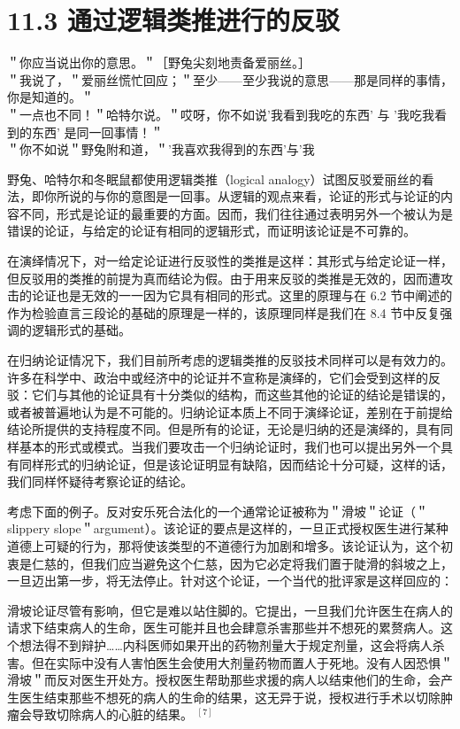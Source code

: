 \section*{11.3 通过逻辑类推进行的反驳}
＂你应当说出你的意思。＂［野兔尖刻地责备爱丽丝。］\\
＂我说了，＂爱丽丝慌忙回应；＂至少——至少我说的意思——那是同样的事情，你是知道的。＂\\
＂一点也不同！＂哈特尔说。＂哎呀，你不如说'我看到我吃的东西' 与 '我吃我看到的东西' 是同一回事情！＂\\
＂你不如说＂野兔附和道，＂'我喜欢我得到的东西'与'我

野兔、哈特尔和冬眠鼠都使用逻辑类推（logical analogy）试图反驳爱丽丝的看法，即你所说的与你的意图是一回事。从逻辑的观点来看，论证的形式与论证的内容不同，形式是论证的最重要的方面。因而，我们往往通过表明另外一个被认为是错误的论证，与给定的论证有相同的逻辑形式，而证明该论证是不可靠的。

在演绎情况下，对一给定论证进行反驳性的类推是这样：其形式与给定论证一样，但反驳用的类推的前提为真而结论为假。由于用来反驳的类推是无效的，因而遭攻击的论证也是无效的一一因为它具有相同的形式。这里的原理与在 6.2 节中阐述的作为检验直言三段论的基础的原理是一样的，该原理同样是我们在 8.4 节中反复强调的逻辑形式的基础。

在归纳论证情况下，我们目前所考虑的逻辑类推的反驳技术同样可以是有效力的。许多在科学中、政治中或经济中的论证并不宣称是演绎的，它们会受到这样的反驳：它们与其他的论证具有十分类似的结构，而这些其他的论证的结论是错误的，或者被普遍地认为是不可能的。归纳论证本质上不同于演绎论证，差别在于前提给结论所提供的支持程度不同。但是所有的论证，无论是归纳的还是演绎的，具有同样基本的形式或模式。当我们要攻击一个归纳论证时，我们也可以提出另外一个具有同样形式的归纳论证，但是该论证明显有缺陷，因而结论十分可疑，这样的话，我们同样怀疑待考察论证的结论。

考虑下面的例子。反对安乐死合法化的一个通常论证被称为＂滑坡＂论证（＂slippery slope＂argument）。该论证的要点是这样的，一旦正式授权医生进行某种道德上可疑的行为，那将使该类型的不道德行为加剧和增多。该论证认为，这个初衷是仁慈的，但我们应当避免这个仁慈，因为它必定将我们置于陡滑的斜坡之上，一旦迈出第一步，将无法停止。针对这个论证，一个当代的批评家是这样回应的：

滑坡论证尽管有影响，但它是难以站住脚的。它提出，一旦我们允许医生在病人的请求下结束病人的生命，医生可能并且也会肆意杀害那些并不想死的累赘病人。这个想法得不到辩护……内科医师如果开出的药物剂量大于规定剂量，这会将病人杀害。但在实际中没有人害怕医生会使用大剂量药物而置人于死地。没有人因恐惧＂滑坡＂而反对医生开处方。授权医生帮助那些求援的病人以结束他们的生命，会产生医生结束那些不想死的病人的生命的结果，这无异于说，授权进行手术以切除肿瘤会导致切除病人的心脏的结果。 ${ }^{[7]}$

